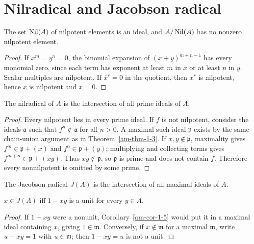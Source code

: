 \section{Nilradical and Jacobson radical}
\label{am-ch1-radicals}
\begin{proposition}
\label{am-prop-1-7}
\uses{}
The set $\operatorname{Nil}(A)$ of nilpotent elements is an ideal, and $A/\operatorname{Nil}(A)$ has no
nonzero nilpotent element.
\end{proposition}
\begin{proof}
If $x^m=y^n=0$, the binomial expansion of $(x+y)^{m+n-1}$ has every monomial
zero, since each term has exponent at least $m$ in $x$ or at least $n$ in $y$.
Scalar multiples are nilpotent.  If $\bar x^r=0$ in the quotient, then
$x^r$ is nilpotent, hence $x$ is nilpotent and $\bar x=0$.
\end{proof}
\begin{proposition}
\label{am-prop-1-8}
\uses{}
The nilradical of $A$ is the intersection of all prime ideals of $A$.
\end{proposition}
\begin{proof}
Every nilpotent lies in every prime ideal.  If $f$ is not nilpotent, consider
the ideals $\mathfrak{a}$ such that $f^n\notin\mathfrak{a}$ for all $n>0$.  A maximal such
ideal $\mathfrak{p}$ exists by the same chain-union argument as in Theorem~\ref{am-thm-1-3}.
If $x,y\notin\mathfrak{p}$, maximality gives $f^m\in\mathfrak{p}+(x)$ and
$f^n\in\mathfrak{p}+(y)$; multiplying and collecting terms gives
$f^{m+n}\in\mathfrak{p}+(xy)$.  Thus $xy\notin\mathfrak{p}$, so $\mathfrak{p}$ is prime and does not contain
$f$.  Therefore every nonnilpotent is omitted by some prime.
\end{proof}
\begin{definition}
\label{am-def-jacobson}
\uses{}
The Jacobson radical $J(A)$ is the intersection of all maximal ideals of $A$.
\end{definition}
\begin{proposition}
\label{am-prop-1-9}
\uses{}
$x\in J(A)$ iff $1-xy$ is a unit for every $y\in A$.
\end{proposition}
\begin{proof}
If $1-xy$ were a nonunit, Corollary~\ref{am-cor-1-5} would put it in a maximal
ideal containing $x$, giving $1\in\mathfrak{m}$.  Conversely, if $x\notin\mathfrak{m}$ for a
maximal $\mathfrak{m}$, write $u+xy=1$ with $u\in\mathfrak{m}$; then $1-xy=u$ is not a unit.
\end{proof}

